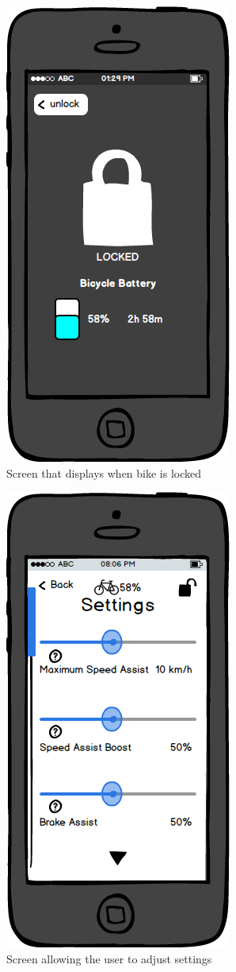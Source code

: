 \documentclass[a4paper]{report}
\begin{document}
\clearpage
\begin{figure}
\centering
\includegraphics[scale=0.9]{figures/prototype_2/locked}
\caption{Screen that displays when bike is locked}
\end{figure}
\clearpage
\begin{figure}
\centering
\includegraphics[scale=0.9]{figures/prototype_2/settings}
\caption{Screen allowing the user to adjust settings}
\end{figure}
\end{document}
